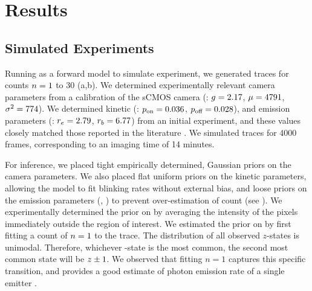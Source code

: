 \section{Results}






\subsection{Simulated Experiments}
Running \ours as a forward model to simulate experiment, 
we generated traces for counts $n=1$ to 30 (a,b).
	We determined experimentally relevant camera parameters from a calibration of the
	sCMOS camera (\parametersc: $g=2.17$, $\mu=4791$, $\sigma^2=774$). 
	We determined kinetic (\parameterst: $p_\text{on}=0.036$, $p_\text{off}=0.028$), and emission parameters 
	(\parameterse: $r_e=2.79$, $r_b=6.77$) from an initial experiment, 
	and these values closely matched those reported in the literature \cite{stein_2021}.
	We simulated traces for 4000 frames, corresponding to an imaging time of 14 minutes.

For inference, we placed tight empirically determined, Gaussian priors on 
the camera parameters.
	We also placed flat uniform priors on the kinetic parameters, allowing the model 
	to fit blinking rates without external bias,
	and loose priors on the emission parameters (\rb, \re) to prevent 
	over-estimation of count (see ). 
	We experimentally determined the prior on \rb by averaging the 
	intensity of the pixels immediately outside the region of interest.
	We estimated the prior on \re  by first fitting a count of $n=1$ to the trace.
	The distribution of all observed $z$-states is unimodal.
	Therefore, whichever \z{}-state is the most common, the second most common state 
	will be $z_{} \pm 1$. 
	We observed that fitting $n=1$ captures this specific transition, and provides a good
	estimate of photon emission rate of a single emitter \re.
	
